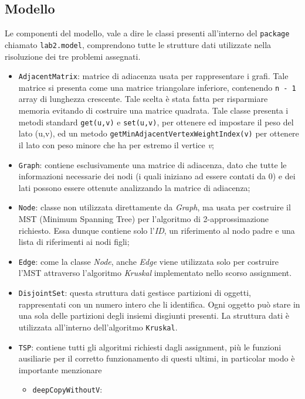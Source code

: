\subsection{Modello}
Le componenti del modello, vale a dire le classi presenti all'interno del \texttt{package} chiamato \texttt{lab2.model}, comprendono tutte le strutture dati utilizzate nella risoluzione dei tre problemi assegnati. 
\begin{itemize}
	\item \texttt{AdjacentMatrix}: matrice di adiacenza usata per rappresentare i grafi. Tale matrice si presenta come una matrice triangolare inferiore, contenendo \texttt{n - 1} array di lunghezza crescente. Tale scelta è stata fatta per risparmiare memoria evitando di costruire una matrice quadrata. Tale classe presenta i metodi standard \texttt{get(u,v)} e \texttt{set(u,v)}, per ottenere ed impostare il peso del lato (u,v), ed un metodo \texttt{getMinAdjacentVertexWeightIndex(v)} per ottenere il lato con peso minore che ha per estremo il vertice \textit{v};
	\item \texttt{Graph}: contiene esclusivamente una matrice di adiacenza, dato che tutte le informazioni necessarie dei nodi (i quali iniziano ad essere contati da 0) e dei lati possono essere ottenute analizzando la matrice di adiacenza;
	\item \texttt{Node}: classe non utilizzata direttamente da \textit{Graph}, ma usata per costruire il MST (Minimum Spanning Tree) per l'algoritmo di 2-approssimazione richiesto. Essa dunque contiene solo l'\textit{ID}, un riferimento al nodo padre e una lista di riferimenti ai nodi figli;
	\item \texttt{Edge}: come la classe \textit{Node}, anche \textit{Edge} viene utilizzata solo per costruire l'MST attraverso l'algoritmo \textit{Kruskal} implementato nello scorso assignment.
	\item \texttt{DisjointSet}: questa struttura dati gestisce partizioni di oggetti, rappresentati con un numero intero che li identifica. Ogni oggetto può stare in una sola delle partizioni degli insiemi disgiunti presenti. La struttura dati è utilizzata all'interno dell'algoritmo \texttt{Kruskal}.
	\item \texttt{TSP}: contiene tutti gli algoritmi richiesti dagli assignment, più le funzioni ausiliarie per il corretto funzionamento di questi ultimi, in particolar modo è importante menzionare
	\begin{itemize}
		\item \texttt{deepCopyWithoutV}:

\end{itemize}
\end{itemize}
